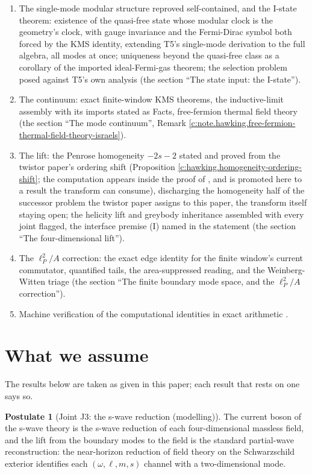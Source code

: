 \documentclass[11pt]{article}
\theoremstyle{definition}
\newtheorem{postulate}[theorem]{Postulate}
\theoremstyle{plain}
\begin{document}
\begin{enumerate}
\item The single-mode modular structure reproved self-contained, and the I-state theorem: existence of the quasi-free state whose modular clock is the geometry's clock, with gauge invariance and the Fermi-Dirac symbol both forced by the KMS identity, extending T5's single-mode derivation \cite[Thm.~7.20]{ButlerT5} to the full algebra, all modes at once; uniqueness beyond the quasi-free class as a corollary of the imported ideal-Fermi-gas theorem; the selection problem posed against T5's own analysis (the section ``The state input: the I-state'').
\item The continuum: exact finite-window KMS theorems, the inductive-limit assembly with its imports stated as Facts, free-fermion thermal field theory (the section ``The mode continuum'', Remark \ref{c:note.hawking.free-fermion-thermal-field-theory-israels}).
\item The lift: the Penrose homogeneity $-2s-2$ stated and proved from the twistor paper's ordering shift (Proposition \ref{c:hawking.homogeneity-ordering-shift}; the computation appears inside the proof of \cite[Thm.~5.7]{ButlerT9}, and is promoted here to a result the transform can consume), discharging the homogeneity half of the successor problem the twistor paper assigns to this paper, the transform itself staying open; the helicity lift and greybody inheritance assembled with every joint flagged, the interface premise (I) named in the statement (the section ``The four-dimensional lift'').
\item The $\ell_P^2/A$ correction: the exact edge identity for the finite window's current commutator, quantified tails, the area-suppressed reading, and the Weinberg-Witten triage (the section ``The finite boundary mode space, and the $\ell_P^2/A$ correction'').
\item Machine verification of the computational identities in exact arithmetic \cite{ButlerVerifyT7}.
\end{enumerate}

\section*{What we assume}
The results below are taken as given in this paper; each result that rests on one says so.
\begin{postulate}[Joint J3: the s-wave reduction (modelling)]\label{c:hawking.joint-j3-s-wave-reduction}
The current boson of the s-wave theory is the s-wave reduction of each four-dimensional massless field, and the lift from the boundary modes to the field is the standard partial-wave reconstruction: the near-horizon reduction of field theory on the Schwarzschild exterior identifies each $(\omega, \ell, m, s)$ channel with a two-dimensional mode.
\end{postulate}
\end{document}
